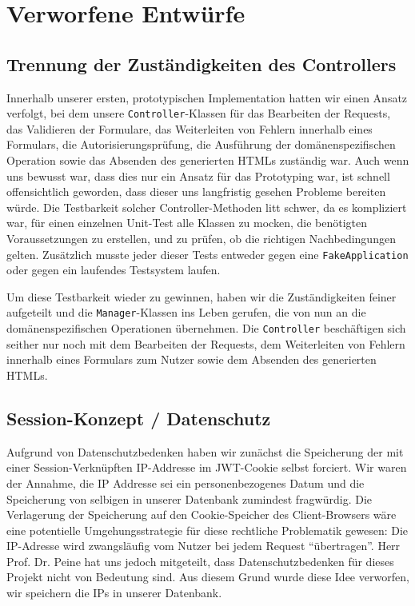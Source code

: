 \documentclass[12pt,DIV14,BCOR10mm,a4paper,parskip=half-,headsepline,headinclude,english,ngerman,bibliography=totocnumbered]{scrreprt}
\begin{document}
\chapter{Verworfene Entwürfe}

\section{Trennung der Zuständigkeiten des Controllers}

Innerhalb unserer ersten, prototypischen Implementation hatten wir einen Ansatz verfolgt, bei dem unsere \texttt{Controller}-Klassen für das Bearbeiten der Requests, das Validieren der Formulare, das Weiterleiten von Fehlern innerhalb eines Formulars, die Autorisierungsprüfung, die Ausführung der domänenspezifischen Operation sowie das Absenden des generierten HTMLs zuständig war.
Auch wenn uns bewusst war, dass dies nur ein Ansatz für das Prototyping war, ist schnell offensichtlich geworden, dass dieser uns langfristig gesehen Probleme bereiten würde.
Die Testbarkeit solcher Controller-Methoden litt schwer, da es kompliziert war, für einen einzelnen Unit-Test alle Klassen zu mocken, die benötigten Voraussetzungen zu erstellen, und zu prüfen, ob die richtigen Nachbedingungen gelten.
Zusätzlich musste jeder dieser Tests entweder gegen eine \texttt{FakeApplication} oder gegen ein laufendes Testsystem laufen.

Um diese Testbarkeit wieder zu gewinnen, haben wir die Zuständigkeiten feiner aufgeteilt und die \texttt{Manager}-Klassen ins Leben gerufen, die von nun an die domänenspezifischen Operationen übernehmen.
Die \texttt{Controller} beschäftigen sich seither nur noch mit dem Bearbeiten der Requests, dem Weiterleiten von Fehlern innerhalb eines Formulars zum Nutzer sowie dem Absenden des generierten HTMLs.

\section{Session-Konzept / Datenschutz}
Aufgrund von Datenschutzbedenken haben wir zunächst die Speicherung der mit einer Session-Verknüpften IP-Addresse im JWT-Cookie selbst forciert. Wir waren der Annahme, die IP Addresse sei ein personenbezogenes Datum und die Speicherung von selbigen in unserer Datenbank zumindest fragwürdig. Die Verlagerung der Speicherung auf den Cookie-Speicher des Client-Browsers wäre eine potentielle Umgehungsstrategie für diese rechtliche Problematik gewesen: Die IP-Adresse wird zwangsläufig vom Nutzer bei jedem Request \enquote{übertragen}. Herr Prof. Dr. Peine hat uns jedoch mitgeteilt, dass Datenschutzbedenken für dieses Projekt nicht von Bedeutung sind. Aus diesem Grund wurde diese Idee verworfen, wir speichern die IPs in unserer Datenbank.
\end{document}
